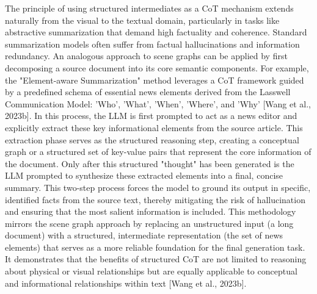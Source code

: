 \documentclass[11pt]{article}
\begin{document}
The principle of using structured intermediates as a CoT mechanism extends naturally from the visual to the textual domain, particularly in tasks like abstractive summarization that demand high factuality and coherence. Standard summarization models often suffer from factual hallucinations and information redundancy. An analogous approach to scene graphs can be applied by first decomposing a source document into its core semantic components. For example, the "Element-aware Summarization" method leverages a CoT framework guided by a predefined schema of essential news elements derived from the Lasswell Communication Model: 'Who', 'What', 'When', 'Where', and 'Why' [Wang et al., 2023b]. In this process, the LLM is first prompted to act as a news editor and explicitly extract these key informational elements from the source article. This extraction phase serves as the structured reasoning step, creating a conceptual graph or a structured set of key-value pairs that represent the core information of the document. Only after this structured "thought" has been generated is the LLM prompted to synthesize these extracted elements into a final, concise summary. This two-step process forces the model to ground its output in specific, identified facts from the source text, thereby mitigating the risk of hallucination and ensuring that the most salient information is included. This methodology mirrors the scene graph approach by replacing an unstructured input (a long document) with a structured, intermediate representation (the set of news elements) that serves as a more reliable foundation for the final generation task. It demonstrates that the benefits of structured CoT are not limited to reasoning about physical or visual relationships but are equally applicable to conceptual and informational relationships within text [Wang et al., 2023b].
\end{document}
